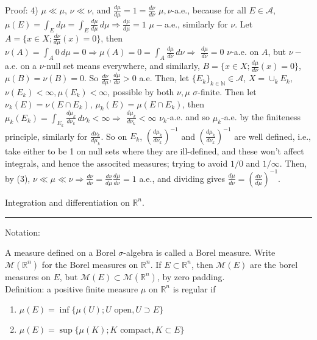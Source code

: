 \documentclass[12pt]{article}
\newcommand{\rimply}[0] { \Rightarrow }
\newcommand{\nats}[0] { \mathbb{N}}
\newcommand{\reals}[0] { \mathbb{R}}
\newcommand{\A}[0] { \mathcal{A} }
\newcommand{\M}[0] { \mathcal{M} }
\begin{document}
\noindent
Proof: 4) $\mu \ll \mu$, $\nu \ll \nu$, and $\frac{d\mu}{d\mu} = 1 = \frac{d\nu}{d\nu}$ $\mu,\nu$-a.e., because for all $E \in \A$, $\mu(E) = \int_E d\mu = \int_E \frac{d\mu}{d\mu} \, d\mu \rimply \frac{d\mu}{d\mu} = 1$ $\mu-$a.e., similarly for $\nu$.  Let $A = \{ x \in X; \frac{d\nu}{d\mu} (x) = 0 \}$, then $\nu(A) = \int_A 0 \, d\mu = 0 \rimply \mu(A) = 0 = \int_A \frac{d\mu}{d\nu} \, d\nu \rimply$ $ \frac{d\mu}{d\nu} = 0$ $\nu$-a.e. on $A$, but $\nu-$a.e. on a $\nu$-null set means everywhere, and similarly, $B = \{ x \in X; \frac{d\mu}{d\nu} (x) = 0 \}$, $\mu(B) = \nu(B) = 0$. So $\frac{d\nu}{d\mu}, \frac{d\mu}{d\nu} > 0$ a.e. Then, let $\{E_k \}_{k \in \nats} \in \A$, $X = \cup_k E_k$, $\nu(E_k) < \infty, \mu(E_k) < \infty$, possible by both $\nu, \mu$ $\sigma$-finite. Then let $\nu_k(E) = \nu(E \cap E_k)$, $\mu_k(E) = \mu(E \cap E_k)$, then $\mu_k(E_k) = \int_{E_k} \frac{d\mu_k}{d\nu_k} \, d\nu_k < \infty \rimply$ $\frac{d\mu_k}{d\nu_k} < \infty$ $\nu_k$-a.e. and so $\mu_k$-a.e. by the finiteness principle, similarly for $\frac{d\nu_k}{d\mu_k}$. So on $E_k$, $\left( \frac{d\mu_k}{d\nu_k} \right) ^{-1}$ and $\left( \frac{d\mu_k}{d\nu_k} \right) ^{-1}$ are well defined, i.e., take either to be 1 on null sets where they are ill-defined, and these won't affect integrals, and hence the associted measures; trying to avoid $1/0$ and $1/\infty$. Then, by (3), $ \nu \ll \mu \ll \nu \rimply \frac{d\nu}{d\nu}= \frac{d\nu}{d\mu}\frac{d\mu}{d\nu} = 1$ a.e., and dividing gives $\frac{d\mu}{d\nu} = \left( \frac{d\nu}{d\mu} \right)^{-1}$.




\break

\begin{flushleft}
Integration and differentiation on $\reals^n$.
\end{flushleft}

\begin{flushleft}
\addvspace{5pt} \hrule
\end{flushleft}	


Notation:

A measure defined on a Borel $\sigma$-algebra is called a Borel measure. Write $\M(\reals^n)$ for the Borel measures on $\reals^n$. If $E \subset \reals^n$, then $\M(E)$ are the borel measures on $E$, but $\M(E) \subset \M(\reals^n)$, by zero padding. \\

Definition: a positive finite measure $\mu$ on $\reals^n$ is regular if

\begin{enumerate}
\item
$\mu(E) = \inf \{ \mu(U) ; U \textrm{ open}, U \supset E \}$
\item
$\mu(E) = \sup \{ \mu(K) ; K \textrm{ compact}, K \subset E \}$
\end{enumerate}
\end{document}
